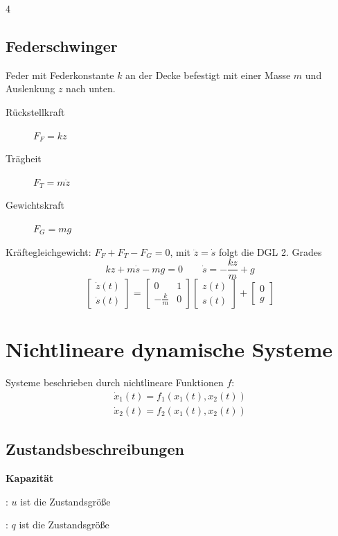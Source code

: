 \documentclass[fs, footer]{latex4ei}
\begin{document}
\begin{multicols*}{4}
        \subsection{Federschwinger}
        Feder mit Federkonstante $k$ an der Decke befestigt mit einer Masse $m$ und Auslenkung $z$ nach unten.
        \begin{description}
        \item[Rückstellkraft] $F_F=kz$
        \item[Trägheit] $F_T=m\ddot z$
        \item[Gewichtskraft] $F_G=mg$
        \end{description}
        Kräftegleichgewicht: $F_F+F_T-F_G=0$, mit $\ddot z = \dot s$ folgt die DGL 2. Grades
        \begin{equation*}
            kz+m\dot s-mg = 0 \qquad \dot s = -\frac{kz}{m} + g
        \end{equation*}
        \begin{equation*}
            \begin{bmatrix}
                \dot z (t) \\ \dot s(t)
            \end{bmatrix} = \begin{bmatrix}
                0 & 1 \\ -\frac km & 0
            \end{bmatrix} \begin{bmatrix}
                z(t) \\ s(t)
            \end{bmatrix} + \begin{bmatrix}
                0 \\g
            \end{bmatrix}
        \end{equation*}

        \section{Nichtlineare dynamische Systeme}
        Systeme beschrieben durch nichtlineare Funktionen $f$:
        \begin{align*}
            \dot x_1(t)=f_1(x_1(t), x_2(t)) \\
            \dot x_2(t)=f_2(x_1(t), x_2(t))
        \end{align*}

        \subsection{Zustandsbeschreibungen}
        \textbf{Kapazität}
        \begin{description}[labelindent=3mm]
        \item[spannungsgesteuert]: $u$ ist die Zustandsgröße
        \item[nur ladungsgesteuert]: $q$ ist die Zustandsgröße
        \end{description}


\end{multicols*}
\end{document}
